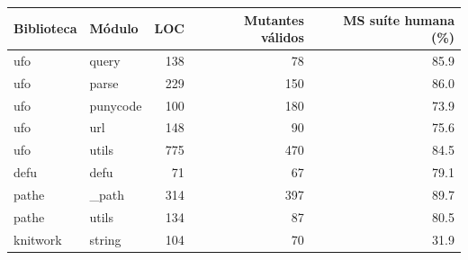 \begin{tabular}{llrrr}
\toprule
Biblioteca & Módulo & LOC & Mutantes válidos & MS suíte humana (\%) \\
\midrule
ufo & query & 138 & 78 & 85.9 \\
ufo & parse & 229 & 150 & 86.0 \\
ufo & punycode & 100 & 180 & 73.9 \\
ufo & url & 148 & 90 & 75.6 \\
ufo & utils & 775 & 470 & 84.5 \\
defu & defu & 71 & 67 & 79.1 \\
pathe & \_path & 314 & 397 & 89.7 \\
pathe & utils & 134 & 87 & 80.5 \\
knitwork & string & 104 & 70 & 31.9 \\
\bottomrule
\end{tabular}
